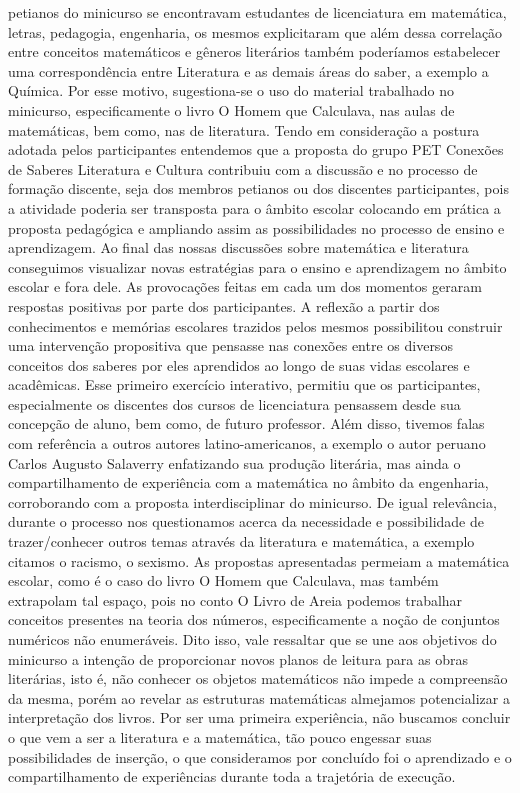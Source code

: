 petianos do minicurso se encontravam estudantes de licenciatura em matemática, letras,
pedagogia, engenharia, os mesmos explicitaram que além dessa correlação entre conceitos
matemáticos e gêneros literários também poderíamos estabelecer uma correspondência entre
Literatura e as demais áreas do saber, a exemplo a Química. Por esse motivo, sugestiona-se o uso
do material trabalhado no minicurso, especificamente o livro O Homem que Calculava, nas aulas
de matemáticas, bem como, nas de literatura. Tendo em consideração a postura adotada pelos
participantes entendemos que a proposta do grupo PET Conexões de Saberes Literatura e Cultura
contribuiu com a discussão e no processo de formação discente, seja dos membros petianos ou
dos discentes participantes, pois a atividade poderia ser transposta para o âmbito escolar
colocando em prática a proposta pedagógica e ampliando assim as possibilidades no processo de
ensino e aprendizagem.
Ao final das nossas discussões sobre matemática e literatura conseguimos visualizar novas
estratégias para o ensino e aprendizagem no âmbito escolar e fora dele. As provocações feitas em
cada um dos momentos geraram respostas positivas por parte dos participantes. A reflexão a
partir dos conhecimentos e memórias escolares trazidos pelos mesmos possibilitou construir uma
intervenção propositiva que pensasse nas conexões entre os diversos conceitos dos saberes por
eles aprendidos ao longo de suas vidas escolares e acadêmicas. Esse primeiro exercício
interativo, permitiu que os participantes, especialmente os discentes dos cursos de licenciatura
pensassem desde sua concepção de aluno, bem como, de futuro professor.
Além disso, tivemos falas com referência a outros autores latino-americanos, a exemplo o autor
peruano Carlos Augusto Salaverry enfatizando sua produção literária, mas ainda o
compartilhamento de experiência com a matemática no âmbito da engenharia, corroborando com
a proposta interdisciplinar do minicurso.
De igual relevância, durante o processo nos questionamos acerca da necessidade e possibilidade
de trazer/conhecer outros temas através da literatura e matemática, a exemplo citamos o racismo,
o sexismo. As propostas apresentadas permeiam a matemática escolar, como é o caso do livro O
Homem que Calculava, mas também extrapolam tal espaço, pois no conto O Livro de Areia
podemos trabalhar conceitos presentes na teoria dos números, especificamente a noção de
conjuntos numéricos não enumeráveis. Dito isso, vale ressaltar que se une aos objetivos do
minicurso a intenção de proporcionar novos planos de leitura para as obras literárias, isto é, não
conhecer os objetos matemáticos não impede a compreensão da mesma, porém ao revelar as
estruturas matemáticas almejamos potencializar a interpretação dos livros.
Por ser uma primeira experiência, não buscamos concluir o que vem a ser a literatura e a
matemática, tão pouco engessar suas possibilidades de inserção, o que consideramos por
concluído foi o aprendizado e o compartilhamento de experiências durante toda a trajetória de
execução.

